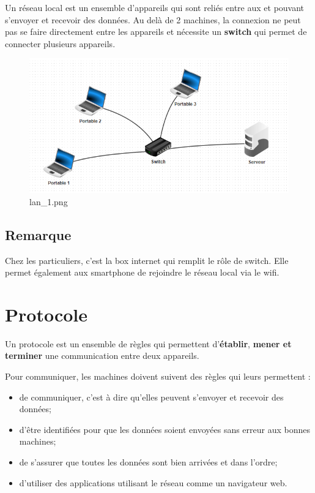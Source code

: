 \documentclass[11pt]{article}
\providecommand{\tightlist}{%
      \setlength{\itemsep}{0pt}\setlength{\parskip}{0pt}}
\begin{document}
Un réseau local est un ensemble d'appareils qui sont reliés entre aux et
pouvant s'envoyer et recevoir des données. Au delà de 2 machines, la
connexion ne peut pas se faire directement entre les appareils et
nécessite un \textbf{switch} qui permet de connecter plusieurs
appareils.

    \begin{figure}
\centering
\includegraphics{img/lan_1.png}
\caption{lan\_1.png}
\end{figure}

    \hypertarget{remarque}{%
\subsection{Remarque}\label{remarque}}

Chez les particuliers, c'est la box internet qui remplit le rôle de
switch. Elle permet également aux smartphone de rejoindre le réseau
local via le wifi.

\hypertarget{protocole}{%
\section{Protocole}\label{protocole}}

Un protocole est un ensemble de règles qui permettent
d'\textbf{établir}, \textbf{mener et terminer} une communication entre
deux appareils.

Pour communiquer, les machines doivent suivent des règles qui leurs
permettent :

\begin{itemize}
\tightlist
\item
  de communiquer, c'est à dire qu'elles peuvent s'envoyer et recevoir
  des données;
\item
  d'être identifiées pour que les données soient envoyées sans erreur
  aux bonnes machines;
\item
  de s'assurer que toutes les données sont bien arrivées et dans
  l'ordre;
\item
  d'utiliser des applications utilisant le réseau comme un navigateur
  web.
\end{itemize}
\end{document}
